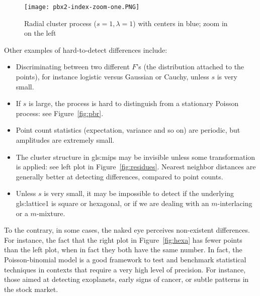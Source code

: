 \documentclass[10pt]{article}
\begin{document}
\begin{figure}[H]
\centering
\texttt{[image: pbx2-index-zoom-one.PNG]}  %
\caption{Radial cluster process ($s=1, \lambda=1$) with centers in blue; zoom in on the left}
\label{fig:pbr4c}
\end{figure}

\noindent Other examples of hard-to-detect differences include:
\begin{itemize}
\item Discriminating between two different $F$'s (the distribution attached to the points), for instance logistic versus Gaussian or Cauchy, unless $s$ is very small.
\item If $s$ is large, the process is hard to distinguish from a stationary Poisson process: see Figure~\ref{fig:pbr}.
\item Point count statistics (expectation, variance and so on) are periodic, but amplitudes are extremely small.
\item The cluster structure in \glspl{gls:mip} may be invisible unless some transformation is applied: see left plot in Figure~\ref{fig:residues}. 
  \textcolor{index}{Nearest neighbor distances} are generally better at detecting differences, compared to point counts.
\item Unless $s$ is very small, it may be impossible to detect if the underlying \gls{gls:lattice1} is square or hexagonal, or if we are dealing with an
  $m$-interlacing or a \textcolor{index}{$m$-mixture}. 
\end{itemize}

\noindent To the contrary, in some cases, the naked eye perceives non-existent differences. For instance, the fact that the right plot in Figure~\ref{fig:hexa} has fewer points than the left plot,
 when in fact they both have the same number. In fact, the Poisson-binomial model is a good framework to test and benchmark statistical techniques in contexts that require a very high 
level of  precision. For instance, those aimed at detecting exoplanets, early signs of cancer, or subtle patterns in the stock market.

\end{document}
